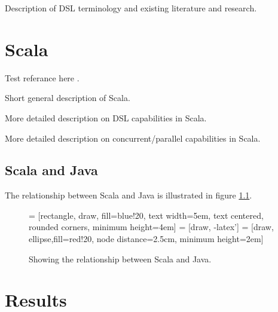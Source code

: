 \documentclass[a4paper,english]{report}
\begin{document}
Description of DSL terminology and existing literature and research.

\chapter{Scala}

Test referance here \cite{hud96}.

Short general description of Scala.

More detailed description on DSL capabilities in Scala.

More detailed description on concurrent/parallel capabilities in Scala.

\section{Scala and Java}

The relationship between Scala and Java is illustrated in figure
\ref{fig:scalajava}.

\begin{figure}
  \begin{center}
   = [rectangle, draw, fill=blue!20, text width=5em, text centered, rounded corners, minimum height=4em]
   = [draw, -latex']
   = [draw, ellipse,fill=red!20, node distance=2.5cm, minimum height=2em]
  \end{center}
  \caption{Showing the relationship between Scala and
    Java.\label{fig:scalajava}}
\end{figure}

\chapter{Results}
\end{document}
